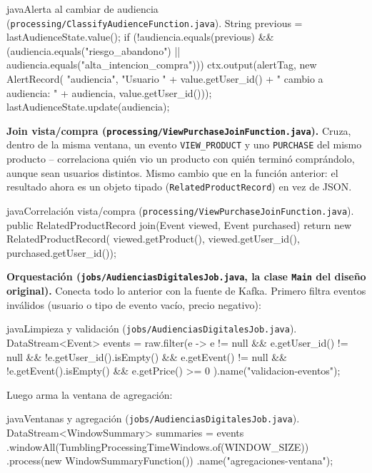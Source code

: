 \begin{sourcecode}[\label{code:classify-fn}]{java}{Alerta al cambiar de audiencia (\texttt{processing/ClassifyAudienceFunction.java}).}
String previous = lastAudienceState.value();
if (!audiencia.equals(previous) &&
        (audiencia.equals("riesgo_abandono") || audiencia.equals("alta_intencion_compra"))) {
    ctx.output(alertTag, new AlertRecord(
            "audiencia",
            "Usuario " + value.getUser_id() + " cambio a audiencia: " + audiencia,
            value.getUser_id()));
}
lastAudienceState.update(audiencia);
\end{sourcecode}

\textbf{Join vista/compra (\texttt{processing/ViewPurchaseJoinFunction.java}).} Cruza, dentro de la misma ventana, un evento \texttt{VIEW\_PRODUCT} y uno \texttt{PURCHASE} del mismo producto -- correlaciona quién vio un producto con quién terminó comprándolo, aunque sean usuarios distintos. Mismo cambio que en la función anterior: el resultado ahora es un objeto tipado (\texttt{RelatedProductRecord}) en vez de JSON.

\begin{sourcecode}[\label{code:join-fn}]{java}{Correlación vista/compra (\texttt{processing/ViewPurchaseJoinFunction.java}).}
public RelatedProductRecord join(Event viewed, Event purchased) {
    return new RelatedProductRecord(
            viewed.getProduct(), viewed.getUser_id(), purchased.getUser_id());
}
\end{sourcecode}

\textbf{Orquestación (\texttt{jobs/AudienciasDigitalesJob.java}, la clase \texttt{Main} del diseño original).} Conecta todo lo anterior con la fuente de Kafka. Primero filtra eventos inválidos (usuario o tipo de evento vacío, precio negativo):

\begin{sourcecode}[\label{code:main-validacion}]{java}{Limpieza y validación (\texttt{jobs/AudienciasDigitalesJob.java}).}
DataStream<Event> events = raw.filter(e ->
        e != null &&
        e.getUser_id() != null && !e.getUser_id().isEmpty() &&
        e.getEvent() != null && !e.getEvent().isEmpty() &&
        e.getPrice() >= 0
).name("validacion-eventos");
\end{sourcecode}

Luego arma la ventana de agregación:

\begin{sourcecode}[\label{code:main-ventanas}]{java}{Ventanas y agregación (\texttt{jobs/AudienciasDigitalesJob.java}).}
DataStream<WindowSummary> summaries = events
        .windowAll(TumblingProcessingTimeWindows.of(WINDOW_SIZE))
        .process(new WindowSummaryFunction())
        .name("agregaciones-ventana");
\end{sourcecode}

